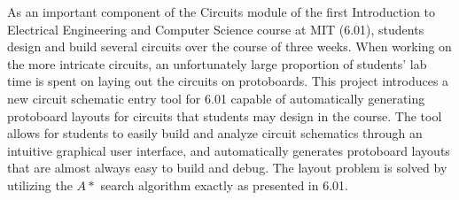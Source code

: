 % 
% 
%

As an important component of the Circuits module of the first Introduction to
Electrical Engineering and Computer Science course at MIT (6.01), students
design and
build several circuits over the course of three weeks. When working on the
more intricate circuits, an unfortunately large proportion of students' lab time
is spent on laying out the circuits on protoboards. This project introduces a
new circuit schematic entry tool for 6.01 capable of automatically generating
protoboard layouts for circuits that students may design in the course. The tool
allows for students to easily build and analyze circuit schematics through an
intuitive
graphical user interface, and automatically generates protoboard layouts that
are almost always easy to build and debug.
The layout problem is solved by utilizing the $A*$ search algorithm exactly as
presented in 6.01.
